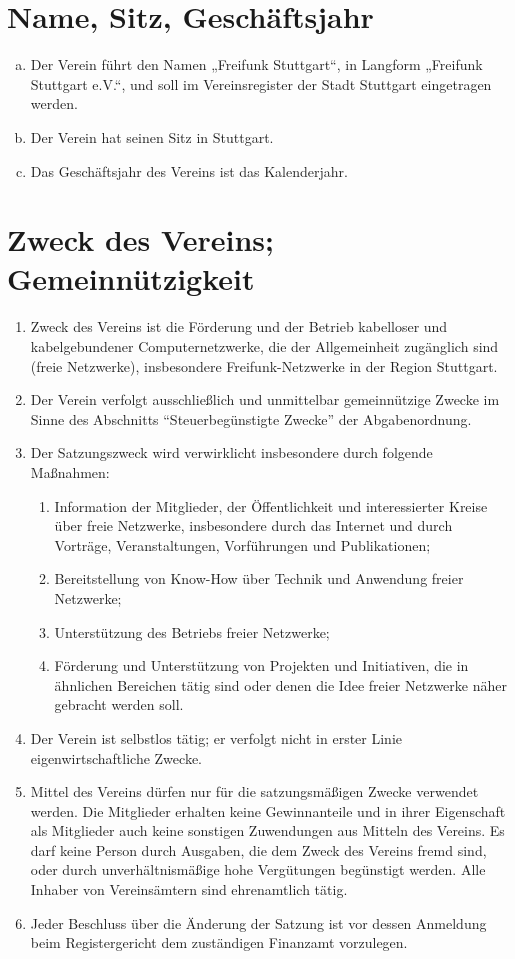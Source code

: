 \chapter{Name, Sitz, Geschäftsjahr}
\begin{enumerate}[a)]
	\item Der Verein führt den Namen „Freifunk Stuttgart“, in Langform „Freifunk Stuttgart e.V.“, und soll im Vereinsregister der Stadt Stuttgart eingetragen werden.
	\item Der Verein hat seinen Sitz in Stuttgart.
	\item Das Geschäftsjahr des Vereins ist das Kalenderjahr.
\end{enumerate}

\chapter{Zweck des Vereins; Gemeinnützigkeit}
\begin{enumerate}
	\item Zweck des Vereins ist die Förderung und der Betrieb kabelloser und kabelgebundener Computernetzwerke, die der Allgemeinheit zugänglich sind (freie Netzwerke), insbesondere Freifunk-Netzwerke in der Region Stuttgart.
	\item Der Verein verfolgt ausschließlich und unmittelbar gemeinnützige Zwecke im Sinne des Abschnitts “Steuerbegünstigte Zwecke” der Abgabenordnung.
	\item Der Satzungszweck wird verwirklicht insbesondere durch folgende Maßnahmen:
		\begin{enumerate}[1)]
			\item Information der Mitglieder, der Öffentlichkeit und interessierter Kreise über freie Netzwerke, insbesondere durch das Internet und durch Vorträge, Veranstaltungen, Vorführungen und Publikationen;
			\item Bereitstellung von Know-How über Technik und Anwendung freier Netzwerke;
			\item Unterstützung des Betriebs freier Netzwerke;
			\item Förderung und Unterstützung von Projekten und Initiativen, die in ähnlichen Bereichen tätig sind oder denen die Idee freier Netzwerke näher gebracht werden soll.
		\end{enumerate}
	\item Der Verein ist selbstlos tätig; er verfolgt nicht in erster Linie eigenwirtschaftliche Zwecke.
	\item Mittel des Vereins dürfen nur für die satzungsmäßigen Zwecke verwendet werden. Die Mitglieder erhalten keine Gewinnanteile und in ihrer Eigenschaft als Mitglieder auch keine sonstigen Zuwendungen aus Mitteln des Vereins. Es darf keine Person durch Ausgaben, die dem Zweck des Vereins fremd sind, oder durch unverhältnismäßige hohe Vergütungen begünstigt werden. Alle Inhaber von Vereinsämtern sind ehrenamtlich tätig.
	\item Jeder Beschluss über die Änderung der Satzung ist vor dessen Anmeldung beim Registergericht dem zuständigen Finanzamt vorzulegen.
\end{enumerate}

